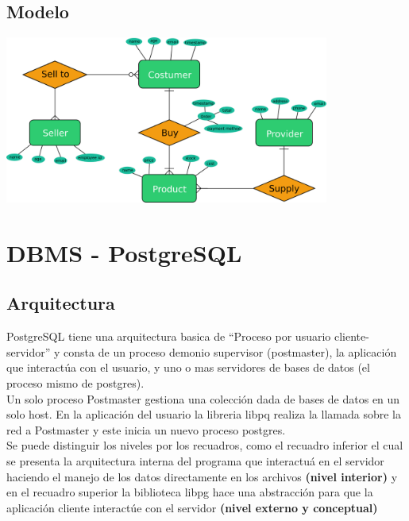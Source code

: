 \documentclass[spanish,12pt,letterpapper]{article}
\begin{document}
	 
	\subsection{Modelo}
	
	\begin{center}
	\includegraphics[width=0.8\textwidth]{./dbmodel}~\\[1cm]
	\end{center} 
	
	\section{DBMS - PostgreSQL}
	
	\subsection{Arquitectura}
	   PostgreSQL tiene una arquitectura basica de ``Proceso por usuario cliente-servidor'' y consta de un proceso demonio supervisor (postmaster), la aplicación que interactúa con el usuario, y uno o mas servidores de bases de datos (el proceso mismo de postgres).\\
	   
	   Un solo proceso Postmaster gestiona una colección dada de bases de datos en un solo host. En la aplicación del usuario la libreria libpq realiza la llamada sobre la red a Postmaster y este inicia un nuevo proceso postgres.\\
	   
	   Se puede distinguir los niveles por los recuadros, como el recuadro inferior el cual se presenta la arquitectura interna del programa que interactuá en el servidor haciendo el manejo de los datos directamente en los archivos \textbf{(nivel interior)} y en el recuadro superior la biblioteca libpg hace una abstracción para que la aplicación cliente interactúe con el servidor \textbf{(nivel externo y conceptual)}\\
	   
\end{document}

